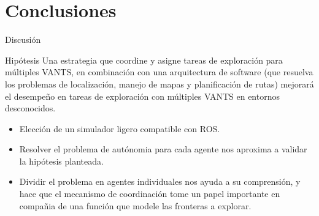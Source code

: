 \documentclass[
  24pt, %
  aspectratio=169, %
]{beamer}
\begin{document}

    

\section{Conclusiones}
\begin{frame}{Discusión}
  
  \begin{block}{Hipótesis}
    Una estrategia que coordine y asigne tareas de exploración para múltiples VANTS, en combinación con una arquitectura de software (que resuelva los problemas de localización, manejo de mapas y planiﬁcación de rutas) mejorará el desempeño en tareas de exploración con múltiples VANTS en entornos desconocidos.
  \end{block}

  \begin{itemize}
    \item Elección de un simulador ligero compatible con ROS.
    \item Resolver el problema de autónomia para cada agente nos aproxima a validar la hipótesis planteada.
    \item Dividir el problema en agentes individuales nos ayuda a su comprensión, y hace que el mecanismo de coordinación tome un papel importante en compañia de una función que modele las fronteras a explorar. 
  \end{itemize}
\end{frame}
\end{document}
